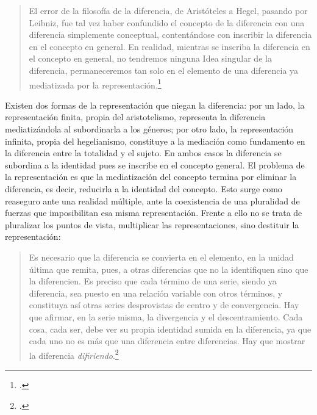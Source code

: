 \begin{quote}
El error de la filosofía de la diferencia, de Aristóteles a Hegel,
pasando por Leibniz, fue tal vez haber confundido el concepto de la
diferencia con una diferencia simplemente conceptual, contentándose con
inscribir la diferencia en el concepto en general. En realidad, mientras
se inscriba la diferencia en el concepto en general, no tendremos
ninguna Idea singular de la diferencia, permaneceremos tan solo en el
elemento de una diferencia ya mediatizada por la
representación.\footcites[58]{deleuze2005a}[La noción de \enquote{diferencia
  interna} resulta central puesto que se permite comprender la distancia
  con una noción de diferencia externa que no solo parte de la
  imposición del concepto exterior, sino de la oposición. En un texto
  donde rastrea la diferencia en Bergson, Deleuze escribe: \enquote{La filosofía
  mantiene una relación positiva y directa con las cosas solamente en la
  medida en que pretende captar la cosa misma de lo que ella es, en su
  diferencia con respecto a todo lo demás, es decir, en su
  \emph{diferencia interna}. (\dots) Si existen diferencias de
  naturaleza entre individuos de un mismo género, habremos de reconocer
  que, efectivamente, la diferencia no es simplemente espacio-temporal,
  ni tampoco genérica o específica y, en suma, que no es exterior ni
  superior a la cosa misma}.][46]{deleuze2005a}
\end{quote}

Existen dos formas de la representación que niegan la diferencia: por un
lado, la representación finita, propia del aristotelismo, representa la
diferencia mediatizándola al subordinarla a los géneros; por otro lado,
la representación infinita, propia del hegelianismo, constituye a la
mediación como fundamento en la diferencia entre la totalidad y el
sujeto. En ambos casos la diferencia se subordina a la identidad pues se
inscribe en el concepto general. El problema de la representación es que
la mediatización del concepto termina por eliminar la diferencia, es
decir, reducirla a la identidad del concepto. Esto surge como reaseguro
ante una realidad múltiple, ante la coexistencia de una pluralidad de
fuerzas que imposibilitan esa misma representación. Frente a ello no se
trata de pluralizar los puntos de vista, multiplicar las
representaciones, sino destituir la representación:

\begin{quote}
Es necesario que la diferencia se convierta en el elemento, en la unidad
última que remita, pues, a otras diferencias que no la identifiquen sino
que la diferencien. Es preciso que cada término de una serie, siendo ya
diferencia, sea puesto en una relación variable con otros términos, y
constituya así otras series desprovistas de centro y de convergencia.
Hay que afirmar, en la serie misma, la divergencia y el descentramiento.
Cada cosa, cada ser, debe ver su propia identidad sumida en la
diferencia, ya que cada uno no es más que una diferencia entre
diferencias. Hay que mostrar la diferencia \emph{difiriendo}.\footcite[101]{deleuze2005b}
\end{quote}


